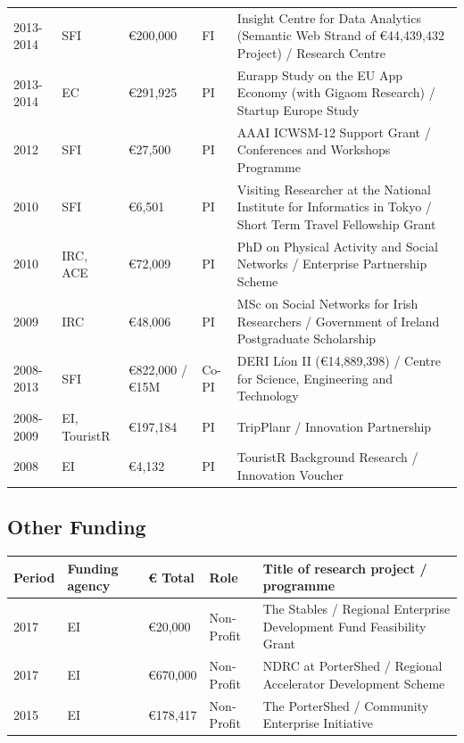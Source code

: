 \documentclass[10pt,a4paper]{res} %
\begin{document}
\begin{resume}
\begin{longtable}{ p{2 cm} | p{2 cm} | p{2 cm} | p{2 cm} | p{7 cm} }
2013-2014 & SFI & \euro{}200,000 & FI & Insight Centre for Data Analytics (Semantic Web Strand of \euro{}44,439,432 Project) / Research Centre \\
2013-2014 & EC & \euro{}291,925 & PI & Eurapp Study on the EU App Economy (with Gigaom Research) / Startup Europe Study \\
2012 & SFI & \euro{}27,500 & PI & AAAI ICWSM-12 Support Grant / Conferences and Workshops Programme \\
2010 & SFI & \euro{}6,501 & PI & Visiting Researcher at the National Institute for Informatics in Tokyo / Short Term Travel Fellowship Grant \\
2010 & IRC, ACE & \euro{}72,009 & PI & PhD on Physical Activity and Social Networks / Enterprise Partnership Scheme \\
2009 & IRC & \euro{}48,006 & PI & MSc on Social Networks for Irish Researchers / Government of Ireland Postgraduate Scholarship \\
2008-2013 & SFI & \euro{}822,000 / \euro{}15M & Co-PI & DERI L\'{i}on II (\euro{}14,889,398) / Centre for Science, Engineering and Technology \\
2008-2009 & EI, TouristR & \euro{}197,184 & PI & TripPlanr / Innovation Partnership \\
2008 & EI & \euro{}4,132 & PI & TouristR Background Research / Innovation Voucher \\
\end{longtable}

\subsection*{Other Funding}

\begin{tabular}{ p{2 cm} | p{2 cm} | p{2 cm} | p{2 cm} | p{7 cm} }
Period & Funding agency & \euro{} Total & Role & Title of research project / programme \\
\hline
2017 & EI & \euro{}20,000 & Non-Profit & The Stables / Regional Enterprise Development Fund Feasibility Grant \\
2017 & EI & \euro{}670,000 & Non-Profit & NDRC at PorterShed / Regional Accelerator Development Scheme \\
2015 & EI & \euro{}178,417 & Non-Profit & The PorterShed / Community Enterprise Initiative \\
\end{tabular}


\end{resume}
\end{document}
